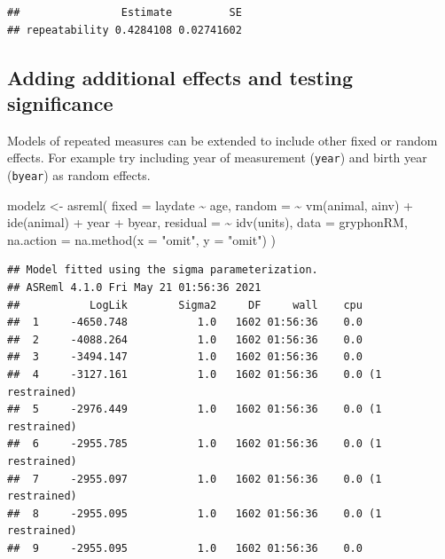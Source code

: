 \documentclass[
  12pt,
]{book}
\newenvironment{Shaded}{\begin{snugshade}}{\end{snugshade}}
\newcommand{\AttributeTok}[1]{\textcolor[rgb]{0.77,0.63,0.00}{#1}}
\newcommand{\FunctionTok}[1]{\textcolor[rgb]{0.00,0.00,0.00}{#1}}
\newcommand{\NormalTok}[1]{#1}
\newcommand{\OtherTok}[1]{\textcolor[rgb]{0.56,0.35,0.01}{#1}}
\newcommand{\SpecialCharTok}[1]{\textcolor[rgb]{0.00,0.00,0.00}{#1}}
\newcommand{\StringTok}[1]{\textcolor[rgb]{0.31,0.60,0.02}{#1}}
\begin{document}
\begin{verbatim}
##                Estimate         SE
## repeatability 0.4284108 0.02741602
\end{verbatim}

\hypertarget{adding-additional-effects-and-testing-significance}{%
\subsection{Adding additional effects and testing significance}\label{adding-additional-effects-and-testing-significance}}

Models of repeated measures can be extended to include other fixed or random effects. For example try including year of measurement (\texttt{year}) and birth year (\texttt{byear}) as random effects.

\begin{Shaded}
\begin{Highlighting}[]
\NormalTok{modelz }\OtherTok{\textless{}{-}} \FunctionTok{asreml}\NormalTok{(}
  \AttributeTok{fixed =}\NormalTok{ laydate }\SpecialCharTok{\textasciitilde{}}\NormalTok{ age,}
  \AttributeTok{random =} \SpecialCharTok{\textasciitilde{}} \FunctionTok{vm}\NormalTok{(animal, ainv) }\SpecialCharTok{+} \FunctionTok{ide}\NormalTok{(animal) }\SpecialCharTok{+}
\NormalTok{    year }\SpecialCharTok{+}\NormalTok{ byear,}
  \AttributeTok{residual =} \SpecialCharTok{\textasciitilde{}} \FunctionTok{idv}\NormalTok{(units),}
  \AttributeTok{data =}\NormalTok{ gryphonRM,}
  \AttributeTok{na.action =} \FunctionTok{na.method}\NormalTok{(}\AttributeTok{x =} \StringTok{"omit"}\NormalTok{, }\AttributeTok{y =} \StringTok{"omit"}\NormalTok{)}
\NormalTok{)}
\end{Highlighting}
\end{Shaded}

\begin{verbatim}
## Model fitted using the sigma parameterization.
## ASReml 4.1.0 Fri May 21 01:56:36 2021
##           LogLik        Sigma2     DF     wall    cpu
##  1     -4650.748           1.0   1602 01:56:36    0.0
##  2     -4088.264           1.0   1602 01:56:36    0.0
##  3     -3494.147           1.0   1602 01:56:36    0.0
##  4     -3127.161           1.0   1602 01:56:36    0.0 (1 restrained)
##  5     -2976.449           1.0   1602 01:56:36    0.0 (1 restrained)
##  6     -2955.785           1.0   1602 01:56:36    0.0 (1 restrained)
##  7     -2955.097           1.0   1602 01:56:36    0.0 (1 restrained)
##  8     -2955.095           1.0   1602 01:56:36    0.0 (1 restrained)
##  9     -2955.095           1.0   1602 01:56:36    0.0
\end{verbatim}
\end{document}
